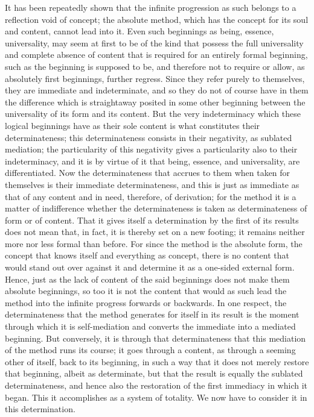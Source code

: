 It has been repeatedly shown that
the infinite progression as such belongs
to a reflection void of concept;
the absolute method, which has the concept
for its soul and content, cannot lead into it.
Even such beginnings as being, essence, universality,
may seem at first to be of the kind that possess
the full universality and complete absence of content
that is required for an entirely formal beginning,
such as the beginning is supposed to be,
and therefore not to require or allow,
as absolutely first beginnings, further regress.
Since they refer purely to themselves,
they are immediate and indeterminate,
and so they do not of course have in them the difference
which is straightaway posited in some other beginning
between the universality of its form and its content.
But the very indeterminacy which these logical beginnings have
as their sole content is what constitutes their determinateness;
this determinateness consists in their negativity,
as sublated mediation;
the particularity of this negativity gives
a particularity also to their indeterminacy,
and it is by virtue of it that
being, essence, and universality, are differentiated.
Now the determinateness that accrues to them
when taken for themselves is their immediate determinateness,
and this is just as immediate as that of any content
and in need, therefore, of derivation;
for the method it is a matter of indifference
whether the determinateness is taken
as determinateness of form or of content.
That it gives itself a determination by
the first of its results does not mean that,
in fact, it is thereby set on a new footing;
it remains neither more nor less formal than before.
For since the method is the absolute form,
the concept that knows itself and everything as concept,
there is no content that would stand out over against it
and determine it as a one-sided external form.
Hence, just as the lack of content of the said beginnings
does not make them absolute beginnings,
so too it is not the content that would as such lead
the method into the infinite progress forwards or backwards.
In one respect, the determinateness that the method generates for itself
in its result is the moment through which it is self-mediation
and converts the immediate into a mediated beginning.
But conversely, it is through that determinateness
that this mediation of the method runs its course;
it goes through a content, as through a seeming other of itself,
back to its beginning, in such a way that it does not merely
restore that beginning, albeit as determinate,
but that the result is equally the sublated determinateness,
and hence also the restoration of the first immediacy in which it began.
This it accomplishes as a system of totality.
We now have to consider it in this determination.

